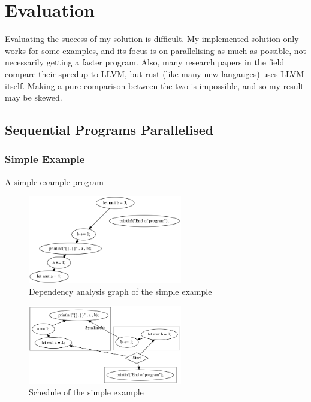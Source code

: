 \chapter{Evaluation}
 Evaluating the success of my solution is difficult. My implemented solution only works for some examples, and its focus is on parallelising as much as possible, not necessarily getting a faster program. Also, many research papers in the field compare their speedup to LLVM, but rust (like many new langauges) uses LLVM itself. Making a pure comparison between the two is impossible, and so my result may be skewed. 


\section{Sequential Programs Parallelised}
\subsection{Simple Example}

\begin{code}
    \caption{A simple example program}
\end{code}

\begin{figure}[H]
    \centering
    \includegraphics[width=0.6\textwidth]{img/simple-example/main-dependency-analysis.png}
    \caption{Dependency analysis graph of the simple example}
\end{figure}

\begin{figure}[H]
    \centering
    \includegraphics[width=0.6\textwidth]{img/simple-example/main-schedule.png}
    \caption{Schedule of the simple example}
\end{figure}

